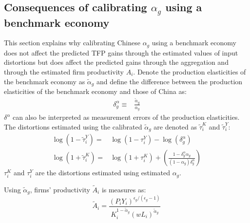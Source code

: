 \documentclass[12pt]{article}
\begin{document}
\subsection{Consequences of calibrating $\alpha_g$ using a benchmark economy} \label{Sec:ConsequenceAlpha}
This section explains why calibrating Chinese $\alpha_g$ using a benchmark economy does not affect the predicted TFP gains through the estimated values of input distortions but does affect the predicted gains through the aggregation and through the estimated firm productivity $A_i$. Denote the production elasticities of the benchmark economy as $\tilde{\alpha}_g$ and define the difference between the production elasticities of the benchmark economy and those of China as:
\begin{align*}
\delta_g^{\alpha} \equiv & \frac{\tilde{\alpha}_g}{\alpha_g}
\end{align*}
$\delta^{\alpha}$ can also be interpreted as measurement errors of the production elasticities. The distortions estimated using the calibrated $\tilde{\alpha}_g$ are denoted as $\tilde{\tau}_i^K$ and $\tilde{\tau}_i^Y$:
\begin{align*}
\log(1-\tilde{\tau}_i^Y)=&\log(1-\tau_i^Y) -\log(\delta_g^{\alpha}) \\
\log(1+\tilde{\tau}_i^K)=&\log(1+\tau_i^K) +\left( \frac{1-\delta_g^{\alpha}\alpha_g}{(1-\alpha_g)\delta_g^{\alpha}} \right)
\end{align*}
$\tau_i^K$ and $\tau_i^Y$ are the distortions estimated using estimated $\alpha_g$. 

Using $\tilde{\alpha}_g$, firms' productivity $\tilde{A}_i$ is measures as:
$$\tilde{A}_i=\frac{( P_{i}Y_{i} )^{\epsilon_g/(\epsilon_g-1)}}{K_{i}^{1-\tilde{\alpha}_g}(wL_{i})^{\tilde{\alpha}_g}}$$ 
\end{document}
